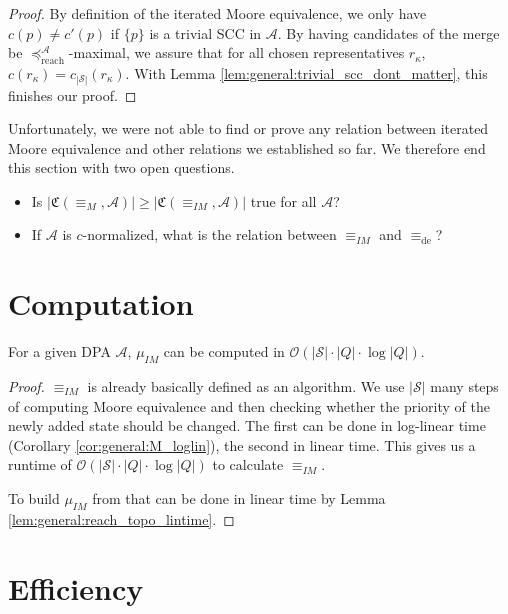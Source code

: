 \begin{proof}
	By definition of the iterated Moore equivalence, we only have $c(p) \neq c'(p)$ if $\{p\}$ is a trivial SCC in $\mathcal{A}$. By having candidates of the merge be $\preceq_\text{reach}^\mathcal{A}$-maximal, we assure that for all chosen representatives $r_\kappa$, $c(r_\kappa) = c_{|\mathcal{S}|}(r_\kappa)$. With Lemma \ref{lem:general:trivial_scc_dont_matter}, this finishes our proof.
\end{proof}

\vspace{10pt}

Unfortunately, we were not able to find or prove any relation between iterated Moore equivalence and other relations we established so far. We therefore end this section with two open questions.

\begin{itemize}
	\item Is $|\mathfrak{C}(\equiv_M, \mathcal{A})| \geq |\mathfrak{C}(\equiv_{IM}, \mathcal{A})|$ true for all $\mathcal{A}$?
	\item If $\mathcal{A}$ is $c$-normalized, what is the relation between $\equiv_{IM}$ and $\equiv_\text{de}$?
\end{itemize}


\section{Computation}
\begin{lem}
	For a given DPA $\mathcal{A}$, $\mu_{IM}$ can be computed in $\mathcal{O}(|\mathcal{S}| \cdot |Q| \cdot \log |Q|)$.
\end{lem}

\begin{proof}
	$\equiv_{IM}$ is already basically defined as an algorithm. We use $|\mathcal{S}|$ many steps of computing Moore equivalence and then checking whether the priority of the newly added state should be changed. The first can be done in log-linear time (Corollary \ref{cor:general:M_loglin}), the second in linear time. This gives us a runtime of $\mathcal{O}(|\mathcal{S}| \cdot |Q| \cdot \log |Q|)$ to calculate $\equiv_{IM}$.

	To build $\mu_{IM}$ from that can be done in linear time by Lemma \ref{lem:general:reach_topo_lintime}.
\end{proof}


\section{Efficiency}




